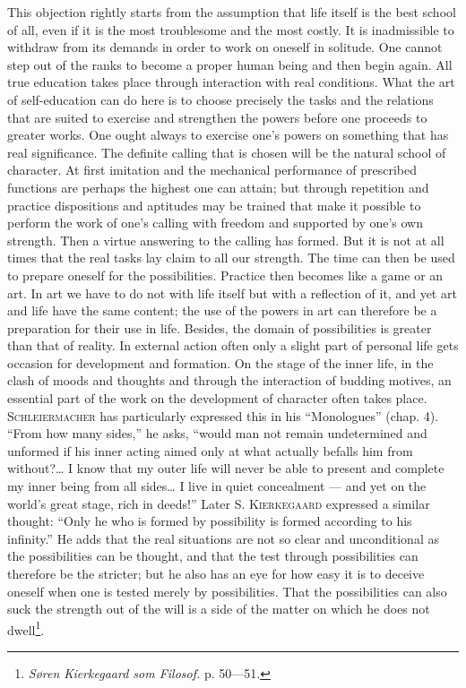 \documentclass[12pt,a4paper,openany]{book}
\newcommand{\opage}[1]{\marginnote{\footnotesize\textit{[#1]}}}
\begin{document}
This objection rightly starts from the assumption that life itself is the best school of all, even if it is
the most troublesome and the most costly. It is inadmissible to withdraw from its demands in order to work on
oneself in solitude. One cannot step out of the ranks to become a proper human being and then begin again.
All true education takes place through interaction with real conditions. What the art of self-education can do
here is to choose precisely the tasks and the relations that are suited to exercise and strengthen the powers
before one proceeds to greater works. One ought always to exercise one's powers on something that has real
significance. The definite calling that is chosen will be the natural school of character. At first imitation
and the mechanical performance of prescribed functions are perhaps the highest one can attain; but through
repetition and practice dispositions and aptitudes may be trained that make it possible to perform the work of
one's calling with freedom and supported by one's own strength. Then a virtue answering to the calling has
formed. But it is not at all times that the real tasks lay claim to all our strength. The time can then be
used to prepare oneself for the possibilities. Practice then becomes like a game or an art. In art we have to
do not with life itself but with
\opage{192}a reflection of it, and yet art and life have the same content; the use of the powers in art can
therefore be a preparation for their use in life. Besides, the domain of possibilities is greater than that of
reality. In external action often only a slight part of personal life gets occasion for development and
formation. On the stage of the inner life, in the clash of moods and thoughts and through the interaction of
budding motives, an essential part of the work on the development of character often takes place.
\textsc{Schleiermacher} has particularly expressed this in his ``Monologues'' (chap. 4). ``From how many
sides,'' he asks, ``would man not remain undetermined and unformed if his inner acting aimed only at what
actually befalls him from without?\dots{} I know that my outer life will never be able to present and complete
my inner being from all sides\dots{} I live in quiet concealment --- and yet on the world's great stage, rich in
deeds!'' Later S. \textsc{Kierkegaard} expressed a similar thought: ``Only he who is formed by possibility is
formed according to his infinity.'' He adds that the real situations are not so clear and unconditional as the
possibilities can be thought, and that the test through possibilities can therefore be the stricter; but he
also has an eye for how easy it is to deceive oneself when one is tested merely by possibilities. That the
possibilities can also suck the strength out of the will is a side of the matter on which he does not
dwell\footnote[1]{\textit{Søren Kierkegaard som Filosof.} p. 50---51.}.
\end{document}
